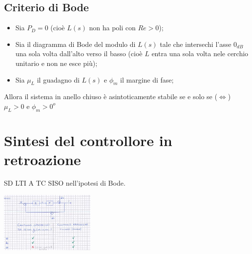 \begin{landscape}
\begin{multicols*}{2}
    \subsection{Criterio di Bode}
    \begin{itemize}
        \item Sia $P_D = 0$ (cioè $L(s)$ non ha poli con $Re > 0$);
        \item Sia il diagramma di Bode del modulo di $L(s)$ tale che intersechi l'asse $0_{dB}$ una sola volta dall'alto verso il basso (cioè $L$ entra una sola volta nele cerchio unitario e non ne esce più);
        \item Sia $\mu_L$ il guadagno di $L(s)$ e $\phi_m$ il margine di fase;
    \end{itemize}
    Allora il sistema in anello chiuso è asintoticamente stabile se e solo se ($\Leftrightarrow$) $\mu_L > 0$ e $\phi_m > 0^o$
    \newpage\section{Sintesi del controllore in retroazione}
    SD LTI A TC SISO nell'ipotesi di Bode.
    \begin{center}
        \includegraphics[height=3cm]{../formulario/img2.JPG}
    \end{center}

\end{multicols*}
\end{landscape}
